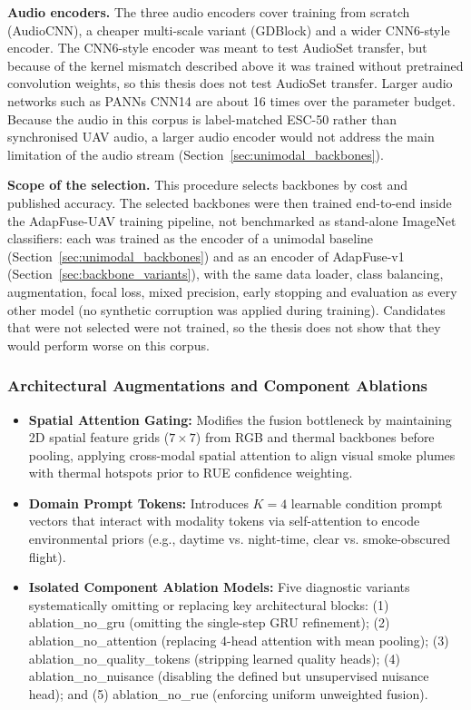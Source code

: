 \documentclass[journal]{IEEEtran}
\begin{document}
\textbf{Audio encoders.} The three audio encoders cover training from scratch (AudioCNN), a cheaper multi-scale variant (GDBlock) and a wider CNN6-style encoder. The CNN6-style encoder was meant to test AudioSet transfer, but because of the kernel mismatch described above it was trained without pretrained convolution weights, so this thesis does not test AudioSet transfer. Larger audio networks such as PANNs CNN14 are about 16 times over the parameter budget. Because the audio in this corpus is label-matched ESC-50 rather than synchronised UAV audio, a larger audio encoder would not address the main limitation of the audio stream (Section~\ref{sec:unimodal_backbones}).

\textbf{Scope of the selection.} This procedure selects backbones by cost and published accuracy. The selected backbones were then trained end-to-end inside the AdapFuse-UAV training pipeline, not benchmarked as stand-alone ImageNet classifiers: each was trained as the encoder of a unimodal baseline (Section~\ref{sec:unimodal_backbones}) and as an encoder of AdapFuse-v1 (Section~\ref{sec:backbone_variants}), with the same data loader, class balancing, augmentation, focal loss, mixed precision, early stopping and evaluation as every other model (no synthetic corruption was applied during training). Candidates that were not selected were not trained, so the thesis does not show that they would perform worse on this corpus.

\subsubsection{Architectural Augmentations and Component Ablations}

\begin{itemize}
    \item \textbf{Spatial Attention Gating:} Modifies the fusion bottleneck by maintaining 2D spatial feature grids ($7 \times 7$) from RGB and thermal backbones before pooling, applying cross-modal spatial attention to align visual smoke plumes with thermal hotspots prior to RUE confidence weighting.
    \item \textbf{Domain Prompt Tokens:} Introduces $K=4$ learnable condition prompt vectors that interact with modality tokens via self-attention to encode environmental priors (e.g., daytime vs. night-time, clear vs. smoke-obscured flight).
    \item \textbf{Isolated Component Ablation Models:} Five diagnostic variants systematically omitting or replacing key architectural blocks: (1) ablation\_no\_gru (omitting the single-step GRU refinement); (2) ablation\_no\_attention (replacing 4-head attention with mean pooling); (3) ablation\_no\_quality\_tokens (stripping learned quality heads); (4) ablation\_no\_nuisance (disabling the defined but unsupervised nuisance head); and (5) ablation\_no\_rue (enforcing uniform unweighted fusion).
\end{itemize}
\end{document}
